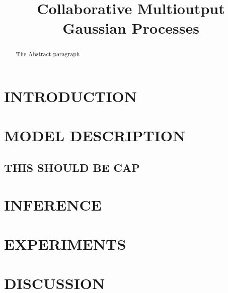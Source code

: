 \documentclass[]{article}
\title{Collaborative Multioutput Gaussian Processes}
\author{} %
\begin{document}
\maketitle

\begin{abstract}
The Abstract paragraph 
\end{abstract}

\section{INTRODUCTION}


\section{MODEL DESCRIPTION}


\subsection{THIS SHOULD BE CAP}

\section{INFERENCE}


\section{EXPERIMENTS}


\section{DISCUSSION}





\end{document}
